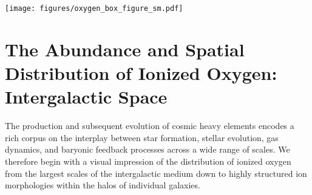 \documentclass[useAMS,usenatbib]{mnras}
\newcommand{\msun}{\,M$_{\odot}$\xspace}
\newcommand{\ovi}{OVI\xspace}
\newcommand{\ovii}{OVII\xspace}
\newcommand{\oviii}{OVIII\xspace}
\begin{document}

\begin{figure*}
\centering
\texttt{[image: figures/oxygen\_box\_figure\_sm.pdf]}
\caption{ The distribution of highly ionized oxygen in the TNG100 cosmological simulation at $z=0$. In the upper panel, the column density of \ovii tracing the large-scale cosmic web of filaments and collapsed halos. Here we project through a depth of 15 Mpc, a seventh of the entire volume. The 50 most massive visible halos are shown as white circles at their virial radii. In the lower right panel, we zoom onto a small galaxy cluster -- the 23rd most massive -- showing its \oviii column in a box of side length $3.5 r_{\rm vir}$. The 50 most massive satellites of this halo are again shown with smaller circles, while the large circle corresponds to the virial radius ($\sim$ 900 kpc) of the halo itself, which has a total mass of $\simeq 10^{13.8}$\msun. In the lower left panel, we further zoom onto the scale of a small group, whose central galaxy has $M_\star \simeq 10^{10.7}$\msun and total $M_{\rm halo} \simeq 10^{12.5}$\msun, showing the \ovi column density projected in a box of side length $3 r_{\rm vir}$.
 \label{fig_box_composite}}
\end{figure*}

\section{The Abundance and Spatial Distribution of Ionized Oxygen: Intergalactic Space} \label{sec_abundance_largescale}

The production and subsequent evolution of cosmic heavy elements encodes a rich corpus on the interplay between star formation, stellar evolution, gas dynamics, and baryonic feedback processes across a wide range of scales. We therefore begin with a visual impression of the distribution of ionized oxygen from the largest scales of the intergalactic medium down to highly structured ion morphologies within the halos of individual galaxies.
\end{document}
